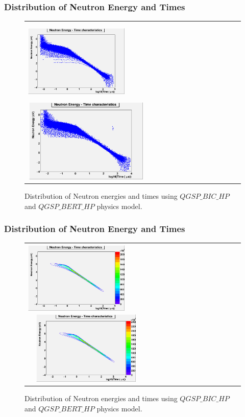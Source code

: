 \documentclass{beamer}
\begin{document}
    \begin{frame}
        \frametitle{Distribution of Neutron Energy and Times}
        \begin{figure}
            \begin{tabular}{ll}
                \includegraphics[height=40mm, width=50mm]{../PICS/NeutEnergyTimeBIC.png} \label{fig:NeutETBIC}                
                \includegraphics[height=40mm, width=60mm]{../PICS/NeutEnergyTimeBERT.png}
                \label{fig:NeutETBERT}
            \end{tabular}
            \caption{Distribution of Neutron energies and times using $QGSP\_BIC\_HP$  and $QGSP\_BERT\_HP$ physics model.}
        \end{figure}
    \end{frame}

    \begin{frame}
        \frametitle{Distribution of Neutron Energy and Times}
        \begin{figure}
            \begin{tabular}{ll}
                \includegraphics[height=35mm, width=50mm]{../PICS/NeutEnergyTimeCONTBIC.png} \label{fig:NeutETCONTBIC}                
                \includegraphics[height=35mm, width=60mm]{../PICS/NeutEnergyTimeCONTBERT.png}
                \label{fig:NeutETCONTBERT}
            \end{tabular}
            \caption{Distribution of Neutron energies and times using $QGSP\_BIC\_HP$ and  $QGSP\_BERT\_HP$ physics model.}
        \end{figure}
    \end{frame}
\end{document}
